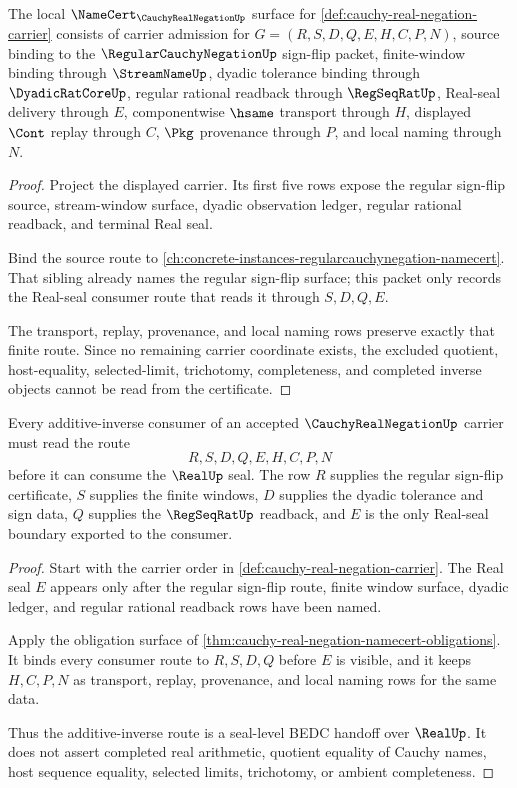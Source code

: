 \begin{theorem}
\label{thm:cauchy-real-negation-namecert-obligations}
The local $\NameCert_{\CauchyRealNegationUp}$ surface for \autoref{def:cauchy-real-negation-carrier} consists of carrier admission for $G=(R,S,D,Q,E,H,C,P,N)$, source binding to the $\RegularCauchyNegationUp$ sign-flip packet, finite-window binding through $\StreamNameUp$, dyadic tolerance binding through $\DyadicRatCoreUp$, regular rational readback through $\RegSeqRatUp$, Real-seal delivery through $E$, componentwise $\hsame$ transport through $H$, displayed $\Cont$ replay through $C$, $\Pkg$ provenance through $P$, and local naming through $N$.
\end{theorem}
\begin{proof}
Project the displayed carrier. Its first five rows expose the regular sign-flip source, stream-window surface, dyadic observation ledger, regular rational readback, and terminal Real seal.

Bind the source route to \autoref{ch:concrete-instances-regularcauchynegation-namecert}. That sibling already names the regular sign-flip surface; this packet only records the Real-seal consumer route that reads it through $S,D,Q,E$.

The transport, replay, provenance, and local naming rows preserve exactly that finite route. Since no remaining carrier coordinate exists, the excluded quotient, host-equality, selected-limit, trichotomy, completeness, and completed inverse objects cannot be read from the certificate.
\end{proof}

\begin{theorem}
\label{thm:cauchy-real-negation-real-seal-route}
Every additive-inverse consumer of an accepted $\CauchyRealNegationUp$ carrier must read the route
$$
R,S,D,Q,E,H,C,P,N
$$
before it can consume the $\RealUp$ seal. The row $R$ supplies the regular sign-flip certificate, $S$ supplies the finite windows, $D$ supplies the dyadic tolerance and sign data, $Q$ supplies the $\RegSeqRatUp$ readback, and $E$ is the only Real-seal boundary exported to the consumer.
\end{theorem}
\begin{proof}
Start with the carrier order in \autoref{def:cauchy-real-negation-carrier}. The Real seal $E$ appears only after the regular sign-flip route, finite window surface, dyadic ledger, and regular rational readback rows have been named.

Apply the obligation surface of \autoref{thm:cauchy-real-negation-namecert-obligations}. It binds every consumer route to $R,S,D,Q$ before $E$ is visible, and it keeps $H,C,P,N$ as transport, replay, provenance, and local naming rows for the same data.

Thus the additive-inverse route is a seal-level BEDC handoff over $\RealUp$. It does not assert completed real arithmetic, quotient equality of Cauchy names, host sequence equality, selected limits, trichotomy, or ambient completeness.
\end{proof}


